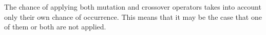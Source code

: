 
The chance of applying both mutation and crossover operators takes into account only their own chance of occurrence. This means that it may be the case that one of them or both are not applied.

